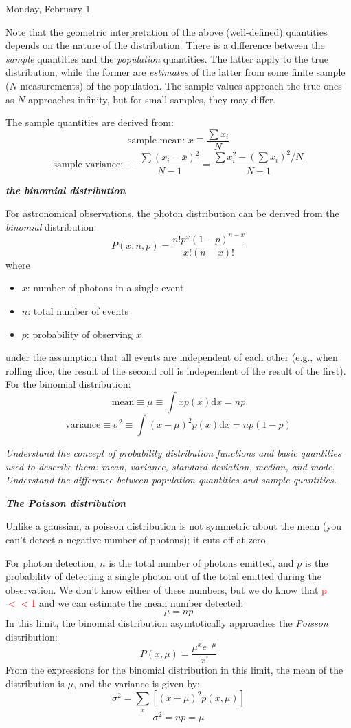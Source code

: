 \documentclass[12pt]{article}
\begin{document}
\textcolor{date}{Monday, February 1}

Note that the geometric interpretation of the above (well-defined)
quantities depends on the nature of the distribution.
There is a difference between the \emph{sample} quantities
and the \emph{population} quantities. The latter apply
to the true distribution, while the former are \emph{estimates} of the latter
from some finite sample ($N$ measurements) of the population.
The sample values approach the true ones as $N$
approaches infinity, but for small samples, they may differ.

The sample quantities are derived from:
$$\textrm{sample\ mean:\ } \bar{x} \equiv \frac{\sum x_i}{N}$$
$$\textrm{sample\ variance:\ } \equiv
  \frac{\sum (x_i-\bar{x})^{2}}{N-1} =
  \frac{\sum x_i^{2}-(\sum x_i)^{2}/N}{N-1}$$

\textbf{\emph{the binomial distribution}}

For astronomical observations, the photon distribution can be derived from the
\emph{binomial} distribution:
   $$ P(x,n,p) = \frac{n!p^x(1-p)^{n-x}}{x!(n-x)!}  $$
where
\begin{itemize}
    \item $x$: number of photons in a single event
    \item $n$: total number of events
    \item $p$: probability of observing $x$
\end{itemize}
under the assumption that all events are independent of each other
(e.g., when rolling dice, the result of the second roll is independent
of the result of the first). For the binomial distribution:
   $$ \textrm{mean} \equiv \mu \equiv \int xp(x)\textrm{d}x = np $$
   $$ \textrm{variance} \equiv \sigma^{2} \equiv
      \int (x-\mu)^{2}p(x)\textrm{d}x = np(1-p) $$

\textcolor{om}{\emph{Understand the concept of probability
distribution functions and basic quantities used to describe them:
mean, variance, standard deviation, median, and mode. Understand the
difference between population quantities and sample quantities.}}

\textbf{\emph{The Poisson distribution}}

Unlike a gaussian, a poisson distribution is not
symmetric about the mean (you can't detect a negative number of
photons); it cuts off at zero.

For photon detection, $n$ is the total number of
photons emitted, and $p$ is the probability of detecting a
single photon out of the total emitted during the observation.
We don't know either of these numbers, but we do know that
\textcolor{red}{p$<<$1} and we can estimate the mean number detected:
  $$  \mu = np $$
In this limit, the binomial distribution asymtotically approaches the
\emph{Poisson} distribution:
   $$  P(x,\mu) = \frac{\mu^x e^{-\mu}}{x!} $$
From the expressions for the binomial distribution in this limit, the
mean of the distribution is $\mu$, and the variance is given by:
  $$  \sigma^{2} = \sum_x [(x-\mu)^{2}p(x,\mu)] $$
  $$  \sigma^{2} = np = \mu  $$
\end{document}

